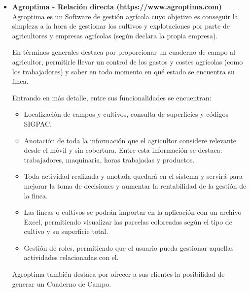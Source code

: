 \begin{itemize}
    \item \textbf{Agroptima - Relación directa (https://www.agroptima.com)}
    \newline
    Agroptima es un Software de gestión agrícola cuyo objetivo es conseguir la simpleza a la hora de gestionar los cultivos
    y explotaciones por parte de agricultores y empresas agrícolas (según declara la propia empresa).

    En términos generales destaca por proporcionar un cuaderno de campo al agricultor, permitirle llevar un control de los 
    gastos y costes agrícolas (como los trabajadores) y saber en todo momento en qué estado se encuentra su finca.

    Entrando en más detalle, entre sus funcionalidades se encuentran:

    \begin{itemize}
        \item Localización de campos y cultivos, consulta de superficies y códigos SIGPAC.
        \item Anotación de toda la información que el agricultor considere relevante desde el móvil y sin cobertura.
        Entre esta información se destaca: trabajadores, maquinaria, horas trabajadas y productos.
        \item Toda actividad realizada y anotada quedará en el sistema y servirá para mejorar la toma de decisiones y 
        aumentar la rentabilidad de la gestión de la finca. 
        \item Las fincas o cultivos se podrán importar en la aplicación con un archivo Excel, permitiendo visualizar
        las parcelas coloreadas según el tipo de cultivo y su superficie total.
        \item Gestión de roles, permitiendo que el usuario pueda gestionar aquellas actividades relacionadas con el.
    \end{itemize}

    Agroptima también destaca por ofrecer a sus clientes la posibilidad de generar un Cuaderno de Campo.


\end{itemize}
